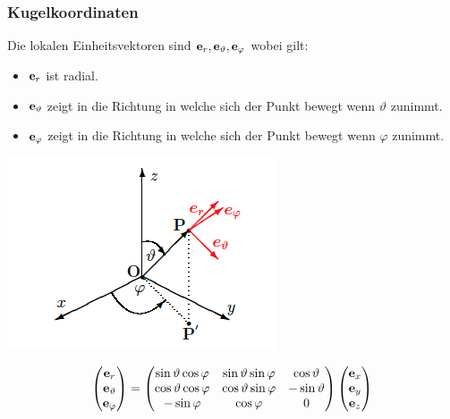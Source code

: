 \subsubsection{Kugelkoordinaten}
Die lokalen Einheitsvektoren sind $\mathbf{e}_{r}, \mathbf{e}_{\vartheta}, \mathbf{e}_{\varphi} $ wobei gilt:
\begin{itemize}
\item $\mathbf{e}_{r}$ ist radial.
\item $\mathbf{e}_{\vartheta}$ zeigt in die Richtung in welche sich der Punkt bewegt wenn $\vartheta$ zunimmt.
\item $\mathbf{e}_{\varphi}$ zeigt in die Richtung in welche sich der Punkt bewegt wenn $\varphi$ zunimmt.
\end{itemize}
\begin{center}
\includegraphics[scale=0.5]{./images/Kugeleinheitsvektoren.png}
\end{center}
\begin{equation}
\begin{pmatrix}
\mathbf{e}_{r} \\ \mathbf{e}_{\vartheta} \\ \mathbf{e}_{\varphi}
\end{pmatrix} =
\begin{pmatrix}
\sin\vartheta\cos\varphi 	& \sin\vartheta\sin\varphi 	& \cos\vartheta \\
\cos\vartheta\cos\varphi 	& \cos\vartheta\sin\varphi 	& -\sin\vartheta \\
-\sin\varphi				 	& \cos\varphi			 	& 0
\end{pmatrix}
\begin{pmatrix}
\mathbf{e}_{x} \\
\mathbf{e}_{y} \\
\mathbf{e}_{z}
\end{pmatrix}
\end{equation}